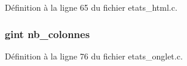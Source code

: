 Définition à la ligne 65 du fichier etats\_\-html.c.

\subsubsection[{nb\_\-colonnes}]{\setlength{\rightskip}{0pt plus 5cm}gint {\bf nb\_\-colonnes}}\label{etats__html_8c_a8c9db61caf800767da87c8e115ed2b12}


Définition à la ligne 76 du fichier etats\_\-onglet.c.


